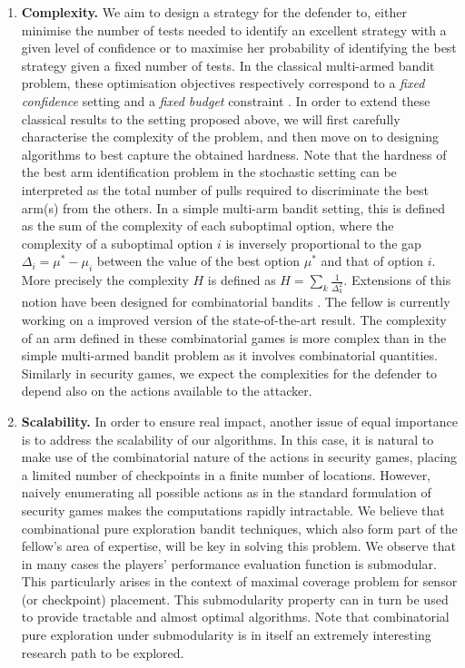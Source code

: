 \begin{enumerate}
 \item \textbf{Complexity.} We aim to design a strategy for the defender to, either minimise the number of tests needed to identify an excellent strategy with a given level of confidence or to maximise her probability of identifying the best strategy given a fixed number of tests. In the classical multi-armed bandit problem, these optimisation objectives respectively correspond to a \textit{fixed confidence} setting\cite{Maron93HR,Even-Dar06AE} and a \textit{fixed budget} constraint \cite{Bubeck09PE,Audibert10BA}. In order to extend these  classical results to the setting proposed above, we will first carefully characterise the complexity of the problem, and then move on to designing algorithms to best capture the obtained hardness. Note that the hardness of the best arm identification problem in the stochastic setting can be interpreted as the total number of pulls required to discriminate the best arm(s) from the others. In a simple multi-arm bandit setting, this is defined as the sum of the complexity of each suboptimal option, where the complexity of a suboptimal option $i$ is inversely proportional to the gap $\Delta_i= \mu^*- \mu_i$ between the value of the best option $\mu^*$ and that of option $i$.
More precisely the complexity $H$ is  defined as $H = \sum_{k} \frac{1}{\Delta_k^2}.$ Extensions of this notion have been designed for combinatorial bandits \cite{chen2014combinatorial}. The fellow is currently working on a improved version of the state-of-the-art result. The complexity of an arm defined in these combinatorial games is  more complex than in the simple multi-armed bandit problem as it involves combinatorial quantities. Similarly in security games, we expect the complexities for the defender to depend also on the actions available to the attacker.
 \item \textbf{Scalability.} In order to ensure real impact, another issue of equal importance is to address the scalability of our algorithms. In this case,  it is natural to make use of the combinatorial nature of the actions in security games, placing a limited number of checkpoints in a finite number of locations. However, naively enumerating all possible actions as in the standard formulation of security games makes the computations rapidly intractable. We believe that combinational pure exploration bandit techniques, which also form part of the fellow's area of expertise, will be key in solving this problem. We observe that in many cases the players' performance evaluation function is submodular. This particularly arises in the context of maximal coverage problem for sensor (or checkpoint) placement\cite{krause2011randomized}. 
 This submodularity property can in turn be used to provide tractable and almost optimal algorithms. Note that combinatorial pure exploration under submodularity is in itself an extremely interesting research path to be explored. 
\end{enumerate}


